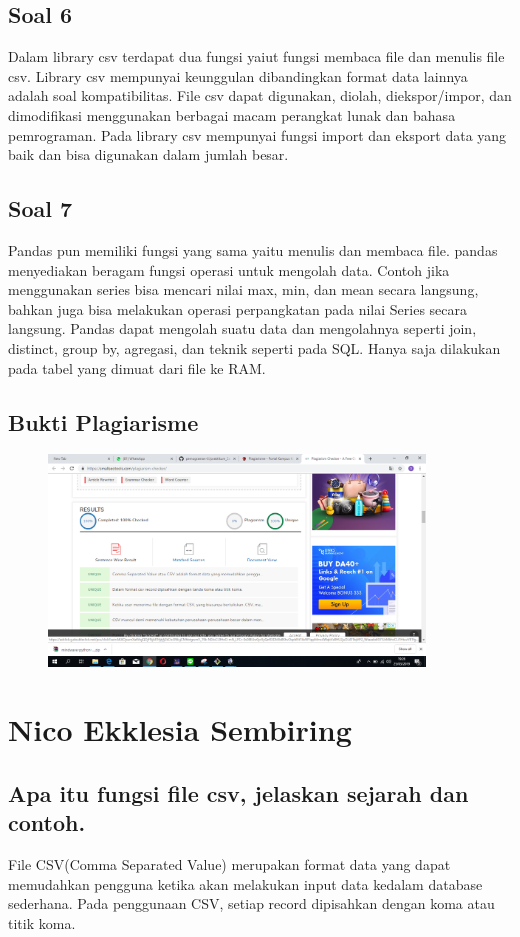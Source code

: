 \subsection{Soal 6}
Dalam library csv terdapat dua fungsi yaiut fungsi membaca file dan menulis file csv.
Library csv mempunyai keunggulan dibandingkan format data lainnya adalah soal kompatibilitas. File csv dapat digunakan, diolah, diekspor/impor, dan dimodifikasi menggunakan berbagai macam perangkat lunak dan bahasa pemrograman. Pada library csv mempunyai fungsi import dan eksport data yang baik dan bisa digunakan dalam jumlah besar.
\subsection{Soal 7}
Pandas pun memiliki fungsi yang sama yaitu menulis dan membaca file. pandas menyediakan beragam fungsi operasi untuk mengolah data. Contoh jika menggunakan series bisa mencari nilai max, min, dan mean secara langsung, bahkan juga bisa melakukan operasi perpangkatan pada nilai Series secara langsung.
Pandas dapat mengolah suatu data dan mengolahnya seperti join, distinct, group by, agregasi, dan teknik seperti pada SQL. Hanya saja dilakukan pada tabel yang dimuat dari file ke RAM.
\subsection{Bukti Plagiarisme}
\begin{figure}[h]
	\includegraphics[width=10cm]{figures/4/1174095/bukti.png}
	\centering
\end{figure}

\section{Nico Ekklesia Sembiring}
\subsection{Apa itu fungsi file csv, jelaskan sejarah dan contoh.}
File CSV(Comma Separated Value) merupakan format data yang dapat memudahkan pengguna ketika akan melakukan input data kedalam database sederhana. Pada penggunaan CSV, setiap record dipisahkan dengan koma atau titik koma.

